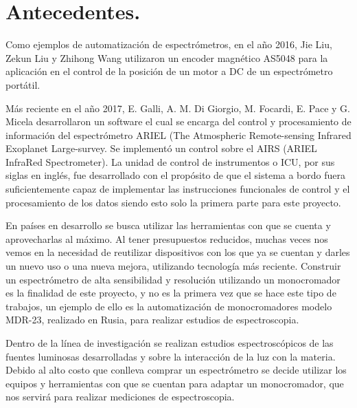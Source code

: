 \section{Antecedentes.}
Como ejemplos de automatización de espectrómetros, en el año 2016, Jie Liu, Zekun Liu y Zhihong Wang utilizaron un encoder magnético AS5048 para la aplicación en el control de la posición de un motor a DC de un espectrómetro portátil. \cite{JieLiu2016}

Más reciente en el año 2017, E. Galli, A. M. Di Giorgio, M. Focardi, E. Pace y G. Micela desarrollaron un software el cual se encarga del control y procesamiento de información del espectrómetro ARIEL (The Atmospheric Remote-sensing Infrared Exoplanet Large-survey. Se implementó un control sobre el AIRS (ARIEL InfraRed Spectrometer). La unidad de control de instrumentos o ICU, por sus siglas en inglés, fue desarrollado con el propósito de que el sistema a bordo fuera suficientemente capaz de implementar las instrucciones funcionales de control y el procesamiento de los datos siendo esto solo la primera parte para este proyecto. \cite{E.GalliA.M.DiGiorgioM.FocardiE.Pace2017}

En países en desarrollo se busca utilizar las herramientas con que se cuenta y aprovecharlas al máximo. Al tener presupuestos reducidos, muchas veces nos vemos en la necesidad de reutilizar dispositivos con los que ya se cuentan y darles un nuevo uso o una nueva mejora, utilizando tecnología más reciente. Construir un espectrómetro de alta sensibilidad y resolución utilizando un monocromador es la finalidad de este proyecto, y no es la primera vez que se hace este tipo de trabajos, un ejemplo de ello es la automatización de monocromadores modelo MDR-23, realizado en Rusia, para realizar estudios de espectroscopia. \cite{Kraminin2015}

Dentro de la línea de investigación se realizan estudios espectroscópicos de las fuentes luminosas desarrolladas y sobre la interacción de la luz con la materia. Debido al alto costo que conlleva comprar un espectrómetro se decide utilizar los equipos y herramientas con que se cuentan para adaptar un monocromador, que nos servirá para realizar mediciones de espectroscopia.





